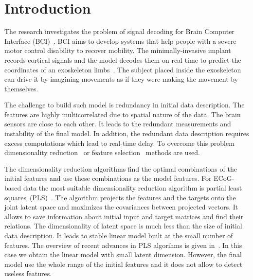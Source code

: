 \documentclass[12pt,oneside]{article}
\theoremstyle{definition}
\begin{document}
\section{Introduction}
The research investigates the problem of signal decoding for Brain Computer Interface (BCI)~\cite{costecalde2018long}. 
BCI aims to develop systems that help people with a severe motor control disability to recover mobility.
The minimally-invasive implant records cortical signals and the model decodes them on real time to predict the coordinates of an exoskeleton limbs~\cite{mestais2015wimagine,eliseyev2014clinatec}.
The subject placed inside the exoskeleton can drive it by imagining movements as if they were making the movement by themselves. 

The challenge to build such model is redundancy in initial data description. 
The features are highly multicorrelated due to spatial nature of the data. 
The brain sensors are close to each other. 
It leads to the redundant measurements and instability of the final model.
In addition, the redundant data description requires excess computations which lead to real-time delay. 
To overcome this problem dimensionality reduction~\cite{chun2010sparse,mehmood2012review} or feature selection~\cite{katrutsa2015stress,li2017feature} methods are used.

The dimensionality reduction algorithms find the optimal combinations of the initial features and use these combinations as the model features. 
For ECoG-based data the most suitable dimensionality reduction algorithm is partial least squares~(PLS)~\cite{eliseyev2014stable,engel2017kernel,eliseyev2012l1}. 
The algorithm projects the features and the targets onto the joint latent space and maximizes the covariances between projected vectors. 
It allows to save information about initial input and target matrices and find their relations. 
The dimensionality of latent space is much less than the size of initial data description. It leads to stable linear model built at the small number of features. 
The overview of recent advances in PLS algorihms is given in~\cite{rosipal2006overview,rosipal2011nonlinear}.
In this case we obtain the linear model with small latent dimension.
However, the final model use the whole range of the initial features and it does not allow to detect useless features. 
\end{document}
